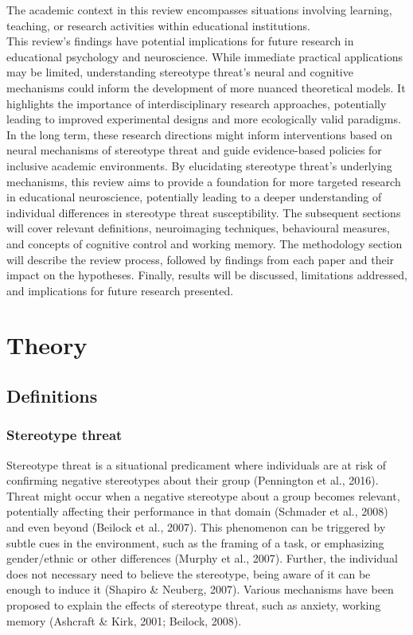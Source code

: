 \documentclass[
  stu, a4paper, 12pt,mask,floatsintext]{apa7}
\begin{document}
The academic context in this review encompasses situations involving learning, teaching, or research activities within educational institutions.\\
This review's findings have potential implications for future research in educational psychology and neuroscience. While immediate practical applications may be limited, understanding stereotype threat's neural and cognitive mechanisms could inform the development of more nuanced theoretical models. It highlights the importance of interdisciplinary research approaches, potentially leading to improved experimental designs and more ecologically valid paradigms.
In the long term, these research directions might inform interventions based on neural mechanisms of stereotype threat and guide evidence-based policies for inclusive academic environments. By elucidating stereotype threat's underlying mechanisms, this review aims to provide a foundation for more targeted research in educational neuroscience, potentially leading to a deeper understanding of individual differences in stereotype threat susceptibility.
The subsequent sections will cover relevant definitions, neuroimaging techniques, behavioural measures, and concepts of cognitive control and working memory. The methodology section will describe the review process, followed by findings from each paper and their impact on the hypotheses. Finally, results will be discussed, limitations addressed, and implications for future research presented.

\section{Theory}\label{theory}

\subsection{Definitions}\label{definitions}

\subsubsection{Stereotype threat}\label{stereotype-threat}

Stereotype threat is a situational predicament where individuals are at risk of confirming negative stereotypes about their group (Pennington et al., 2016).
Threat might occur when a negative stereotype about a group becomes relevant, potentially affecting their performance in that domain (Schmader et al., 2008) and even beyond (Beilock et al., 2007).
This phenomenon can be triggered by subtle cues in the environment, such as the framing of a task, or emphasizing gender/ethnic or other differences (Murphy et al., 2007).
Further, the individual does not necessary need to believe the stereotype, being aware of it can be enough to induce it (Shapiro \& Neuberg, 2007).
Various mechanisms have been proposed to explain the effects of stereotype threat, such as anxiety, working memory (Ashcraft \& Kirk, 2001; Beilock, 2008).
\end{document}
